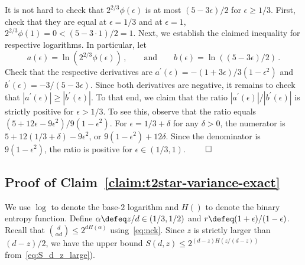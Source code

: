   It is not hard to check that 
  $2^{2/3} \phi(\epsilon)$ is at most $(5 - 3\epsilon)/2$ for $\epsilon \geq 1/3$. 
  First, check that they are equal at $\epsilon = 1/3$ and 
  at $\epsilon = 1$, $2^{2/3}\phi(1) = 0 < (5 - 3\cdot 1)/2 = 1$.
  Next, we establish the claimed
  inequality for respective logarithms. 
  In particular, let 
  \[
      a(\epsilon) = \ln\left( 2^{2/3} \phi(\epsilon) \right)
      \,,\qquad\text{and}\qquad 
      b(\epsilon) = \ln\left( (5 - 3 \epsilon)/2\right)
      \,.
  \]
  Check that the respective derivatives are 
  $a^\prime(\epsilon) = -(1+3 \epsilon)/3(1 - \epsilon^2)$ 
  and $b^\prime(\epsilon) = - 3/(5 - 3\epsilon)$. 
  Since both derivatives are negative, it remains to check that $|a^\prime(\epsilon)| \geq |b^\prime(\epsilon)|$. 
  To that end, we claim that the ratio $|a^\prime(\epsilon)|/|b^\prime(\epsilon)|$ 
  is strictly positive for $\epsilon > 1/3$. 
  To see this, observe that the ratio equals $(5 + 12 \epsilon - 9 \epsilon^2)/9(1-\epsilon^2)$. 
  For $\epsilon = 1/3 + \delta$ for any $\delta > 0$, 
  the numerator is $5 + 12 (1/3 + \delta) - 9 \epsilon^2$, 
  or $9(1 - \epsilon^2) + 12\delta$. 
  Since the denominator is $9(1 - \epsilon^2)$, the ratio is positive for $\epsilon \in(1/3, 1)$. 
\hfill$\qed$





\subsection{Proof of Claim~\ref{claim:t2star-variance-exact}}
  We use $\log$ to denote the base-$2$ logarithm and $H()$ to denote the binary entropy function. 
  Define $\alpha \defeq z/d \in (1/3, 1/2)$ and $r \defeq (1+\epsilon)/(1-\epsilon)$.
  Recall that $\binom{d}{\alpha d} \leq 2^{d H(\alpha)}$ using~\eqref{eq:nck}.
  Since $z$ is strictly larger than $(d - z)/2$, 
  we have the upper bound $S(d,z) \leq 2^{(d-z)H(z/(d-z))}$ from~\eqref{eq:S_d_z_large}). %



